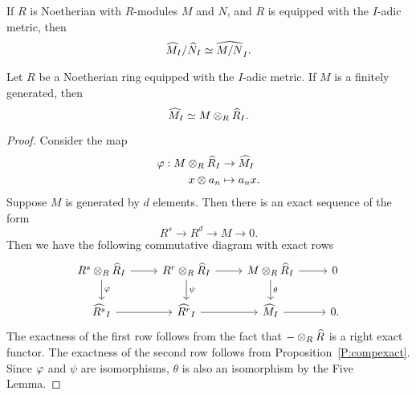 \documentclass{ximera}
\begin{document}
\begin{corollary}
  If $R$ is Noetherian with $R$-modules $M$ and $N$, and $R$ is
  equipped with the $I$-adic metric, then
  \[
  \widehat{M}_I/\widehat{N}_I \simeq \widehat{M/N}_I.
  \]
\end{corollary}

\begin{corollary}
  Let $R$ be a Noetherian ring equipped with the $I$-adic metric. If
  $M$ is a finitely generated, then
  \[
  \widehat{M}_I \simeq M\otimes_R \widehat{R}_I.
  \]   
  \begin{proof}
    Consider the map 
    \begin{align*}
      \varphi: M \otimes_R \widehat{R}_I &\to \widehat{M}_I \\
      x \otimes a_n &\mapsto a_n x.
    \end{align*} 
    Suppose $M$ is generated by $d$ elements.  Then there is an exact
    sequence of the form
    \[
    R^s \to R^d \to M \to 0.
    \] 
    Then we have the following commutative diagram with exact rows
    \[
    \begin{tikzcd}
      R^s \tensor_R \hat{R}_I \ar[d,"\ph"] \ar[r] & R^r \tensor_R \hat{R}_I \ar[r] \ar[d,"\psi"] & M \tensor_R \hat{R}_I \ar[d,"\theta"] \ar[r] & 0 \\
      \hat{R^s}_I \ar[r] & \hat{R^r}_I \ar[r] & \hat{M}_I \ar[r] & 0.
    \end{tikzcd}
    \]
    The exactness of the first row follows from the fact that $-
    \otimes_R \widehat{R}$ is a right exact functor.  The exactness of the
    second row follows from Proposition~\ref{P:compexact}.  Since
    $\varphi$ and $\psi$ are isomorphisms, $\theta$ is also an isomorphism
    by the Five Lemma.
  \end{proof}
\end{corollary}
\end{document}
